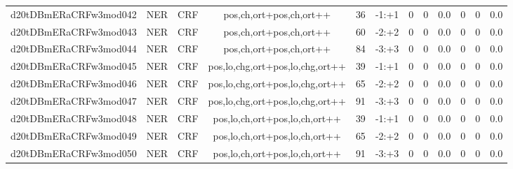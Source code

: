 \documentclass[a4paper]{article}
\begin{document}
\begin{landscape}
\begin{center}
\begin{tabular}{ |c|c|c|c|c|c|c|c|c|c|c|c|}
 
 	
 	\small{ d20tDBmERaCRFw3mod042 } & \small{ NER} & \small{  CRF }  & pos,ch,ort+pos,ch,ort++  &  36 &  \small{  -1:+1 }  &  0 & 0 & 0.0  &  0 & 0 & 0.0 \\
 	

 
 	
 	\small{ d20tDBmERaCRFw3mod043 } & \small{ NER} & \small{  CRF }  & pos,ch,ort+pos,ch,ort++  &  60 &  \small{  -2:+2 }  &  0 & 0 & 0.0  &  0 & 0 & 0.0 \\
 	

 
 	
 	\small{ d20tDBmERaCRFw3mod044 } & \small{ NER} & \small{  CRF }  & pos,ch,ort+pos,ch,ort++  &  84 &  \small{  -3:+3 }  &  0 & 0 & 0.0  &  0 & 0 & 0.0 \\
 	

 
 	
 	\small{ d20tDBmERaCRFw3mod045 } & \small{ NER} & \small{  CRF }  & pos,lo,chg,ort+pos,lo,chg,ort++  &  39 &  \small{  -1:+1 }  &  0 & 0 & 0.0  &  0 & 0 & 0.0 \\
 	

 
 	
 	\small{ d20tDBmERaCRFw3mod046 } & \small{ NER} & \small{  CRF }  & pos,lo,chg,ort+pos,lo,chg,ort++  &  65 &  \small{  -2:+2 }  &  0 & 0 & 0.0  &  0 & 0 & 0.0 \\
 	

 
 	
 	\small{ d20tDBmERaCRFw3mod047 } & \small{ NER} & \small{  CRF }  & pos,lo,chg,ort+pos,lo,chg,ort++  &  91 &  \small{  -3:+3 }  &  0 & 0 & 0.0  &  0 & 0 & 0.0 \\
 	

 
 	
 	\small{ d20tDBmERaCRFw3mod048 } & \small{ NER} & \small{  CRF }  & pos,lo,ch,ort+pos,lo,ch,ort++  &  39 &  \small{  -1:+1 }  &  0 & 0 & 0.0  &  0 & 0 & 0.0 \\
 	

 
 	
 	\small{ d20tDBmERaCRFw3mod049 } & \small{ NER} & \small{  CRF }  & pos,lo,ch,ort+pos,lo,ch,ort++  &  65 &  \small{  -2:+2 }  &  0 & 0 & 0.0  &  0 & 0 & 0.0 \\
 	

 
 	
 	\small{ d20tDBmERaCRFw3mod050 } & \small{ NER} & \small{  CRF }  & pos,lo,ch,ort+pos,lo,ch,ort++  &  91 &  \small{  -3:+3 }  &  0 & 0 & 0.0  &  0 & 0 & 0.0 \\
 	

 
 	

\end{tabular}
\end{center}
\end{landscape}
\end{document}
